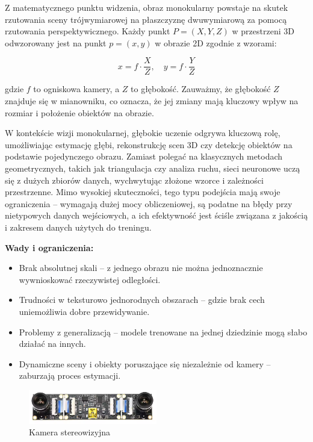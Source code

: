 \documentclass[magisterska]{pracadypl}
\begin{document}
Z matematycznego punktu widzenia, obraz monokularny powstaje na skutek rzutowania sceny trójwymiarowej na płaszczyznę dwuwymiarową za pomocą rzutowania perspektywicznego. Każdy punkt $P = (X,Y,Z)$ w przestrzeni 3D odwzorowany jest na punkt $p = (x,y)$ w obrazie 2D zgodnie z wzorami:

\[
x = f \cdot \frac{X}{Z}, \quad
y = f \cdot \frac{Y}{Z}
\]

gdzie $f$ to ogniskowa kamery, a $Z$ to głębokość. Zauważmy, że głębokość $Z$ znajduje się w mianowniku, co oznacza, że jej zmiany mają kluczowy wpływ na rozmiar i położenie obiektów na obrazie.

W kontekście wizji monokularnej, głębokie uczenie odgrywa kluczową rolę, umożliwiając estymację głębi, rekonstrukcję scen 3D czy detekcję obiektów na podstawie pojedynczego obrazu. Zamiast polegać na klasycznych metodach geometrycznych, takich jak triangulacja czy analiza ruchu, sieci neuronowe uczą się z dużych zbiorów danych, wychwytując złożone wzorce i zależności przestrzenne. Mimo wysokiej skuteczności, tego typu podejścia mają swoje ograniczenia – wymagają dużej mocy obliczeniowej, są podatne na błędy przy nietypowych danych wejściowych, a ich efektywność jest ściśle związana z jakością i zakresem danych użytych do treningu.

\begin{minipage}[t]{\textwidth}
\textbf{Wady i ograniczenia:}
\begin{itemize}
  \item Brak absolutnej skali – z jednego obrazu nie można jednoznacznie wywnioskować rzeczywistej odległości.

  \item Trudności w teksturowo jednorodnych obszarach – gdzie brak cech uniemożliwia dobre przewidywanie.

  \item Problemy z generalizacją – modele trenowane na jednej dziedzinie mogą słabo działać na innych.

  \item Dynamiczne sceny i obiekty poruszające się niezależnie od kamery – zaburzają proces estymacji.
\end{itemize}
\end{minipage}

\begin{figure}[H]  %
    \centering  %
    \includegraphics[width=0.5\textwidth]{images/MAINSTEREO.png}  %
    \captionsetup{font=footnotesize}
    \caption[Kamera stereowizyjna. https://cell-kom.com/inne/21454-kamera-internetowa-full-hd-b16-1080p-5900217390350.html]{Kamera stereowizyjna}
    \label{fig:mono}  %
\end{figure}
\end{document}
